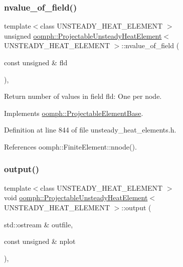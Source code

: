 \subsubsection{\texorpdfstring{nvalue\+\_\+of\+\_\+field()}{nvalue\_of\_field()}}
{\footnotesize\ttfamily template$<$class U\+N\+S\+T\+E\+A\+D\+Y\+\_\+\+H\+E\+A\+T\+\_\+\+E\+L\+E\+M\+E\+NT $>$ \\
unsigned \hyperlink{classoomph_1_1ProjectableUnsteadyHeatElement}{oomph\+::\+Projectable\+Unsteady\+Heat\+Element}$<$ U\+N\+S\+T\+E\+A\+D\+Y\+\_\+\+H\+E\+A\+T\+\_\+\+E\+L\+E\+M\+E\+NT $>$\+::nvalue\+\_\+of\+\_\+field (\begin{DoxyParamCaption}\item[{const unsigned \&}]{fld }\end{DoxyParamCaption})\hspace{0.3cm}{\ttfamily [inline]}, {\ttfamily [virtual]}}



Return number of values in field fld\+: One per node. 



Implements \hyperlink{classoomph_1_1ProjectableElementBase_a1a9a6de16f3511bca8e8be770abb9c2e}{oomph\+::\+Projectable\+Element\+Base}.



Definition at line 844 of file unsteady\+\_\+heat\+\_\+elements.\+h.



References oomph\+::\+Finite\+Element\+::nnode().

\mbox{\label{classoomph_1_1ProjectableUnsteadyHeatElement_a2509779b894af697108d2fa8f2cf1ea8}} 
\subsubsection{\texorpdfstring{output()}{output()}}
{\footnotesize\ttfamily template$<$class U\+N\+S\+T\+E\+A\+D\+Y\+\_\+\+H\+E\+A\+T\+\_\+\+E\+L\+E\+M\+E\+NT $>$ \\
void \hyperlink{classoomph_1_1ProjectableUnsteadyHeatElement}{oomph\+::\+Projectable\+Unsteady\+Heat\+Element}$<$ U\+N\+S\+T\+E\+A\+D\+Y\+\_\+\+H\+E\+A\+T\+\_\+\+E\+L\+E\+M\+E\+NT $>$\+::output (\begin{DoxyParamCaption}\item[{std\+::ostream \&}]{outfile,  }\item[{const unsigned \&}]{nplot }\end{DoxyParamCaption})\hspace{0.3cm}{\ttfamily [inline]}, {\ttfamily [virtual]}}



